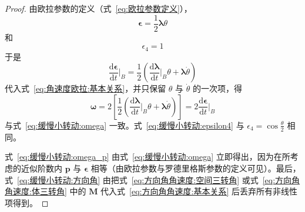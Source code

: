 \begin{proof}
    由欧拉参数的定义（式~\eqref{eq:欧拉参数定义}），
\begin{equation}
    \bm{\epsilon} = \frac{1}{2}\bm{\lambda}\theta
\end{equation}
和
\begin{equation}
    \epsilon_4 = 1
\end{equation}
于是
\begin{equation}
    \frac{\mathrm{d}\bm{\epsilon}}{\mathrm{d}t}\Big|_{B} = \frac{1}{2}\left(\frac{\mathrm{d}\bm{\lambda}}{\mathrm{d}t}\Big|_{B}\theta + \bm{\lambda}\dot{\theta}\right)
\end{equation}
代入式~\eqref{eq:角速度欧拉:基本关系}，并只保留 $\theta$ 与 $\dot{\theta}$ 的一次项，得
\begin{equation}
    \bm{\omega} = 2\left[\frac{1}{2}\left(\frac{\mathrm{d}\bm{\lambda}}{\mathrm{d}t}\Big|_{B}\theta + \bm{\lambda}\dot{\theta}\right)\right] = 2\frac{\mathrm{d}\bm{\epsilon}}{\mathrm{d}t}\Big|_{B}
\end{equation}
与式~\eqref{eq:缓慢小转动:omega} 一致。式~\eqref{eq:缓慢小转动:epsilon4} 与 $\epsilon_4=\cos\frac{\theta}{2}$ 相同。

式~\eqref{eq:缓慢小转动:omega_p} 由式~\eqref{eq:缓慢小转动:omega} 立即得出，因为在所考虑的近似阶数内 $\bm{p}$ 与 $\bm{\epsilon}$ 相等（由欧拉参数与罗德里格斯参数的定义可见）。最后，式~\eqref{eq:缓慢小转动:方向角} 由把式~\eqref{eq:方向角角速度:空间三转角} 或式~\eqref{eq:方向角角速度:体三转角} 中的 $\bm{M}$ 代入式~\eqref{eq:方向角角速度:基本关系} 后丢弃所有非线性项得到。

\end{proof}

